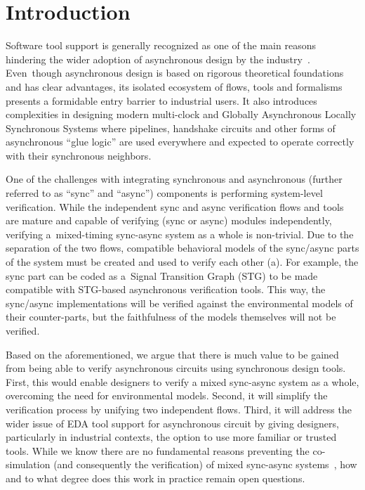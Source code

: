 \section{Introduction}
\label{sec:introduction}

Software tool support is generally recognized as one of the main reasons
hindering the wider adoption of asynchronous design by the
industry~\cite{kondratyev2002design}\cite{nowick2015asynchronous}. Even~though
asynchronous design is based on rigorous theoretical foundations and has clear
advantages, its isolated ecosystem of flows, tools and formalisms presents a
formidable entry barrier to industrial users. It also introduces complexities
in designing modern multi-clock and Globally Asynchronous Locally Synchronous
Systems where pipelines, handshake circuits and other forms of asynchronous
``glue logic'' are used everywhere and expected to operate correctly with
their synchronous neighbors.

One of the challenges with integrating synchronous and asynchronous (further
referred to as ``sync'' and ``async'') components is performing system-level
verification. While the independent sync and async verification flows and
tools are mature and capable of verifying (sync or async) modules
independently, verifying a~mixed-timing sync-async system as a whole is
non-trivial. Due to the separation of the two flows, compatible behavioral
models of the sync/async parts of the system must be created and used to
verify each other (a). For example, the sync part can be
coded as a~Signal Transition Graph (STG) to be made compatible with STG-based
asynchronous verification tools. This way, the sync/async implementations will
be verified against the environmental models of their counter-parts, but the
faithfulness of the models themselves will not be verified.

Based on the aforementioned, we argue that there is much value to be gained
from being able to verify asynchronous circuits using synchronous design
tools. First, this would enable designers to verify a mixed sync-async system
as a whole, overcoming the need for environmental models. Second, it will
simplify the verification process by unifying two independent flows. Third, it
will address the wider issue of EDA tool support for asynchronous circuit by
giving designers, particularly in industrial contexts, the option to use more
familiar or trusted tools. While we know there are no fundamental reasons
preventing the co-simulation (and consequently the verification) of mixed
sync-async systems~\cite{milner1980relating, milner1983calculi}, how and to
what degree does this work in practice remain open questions.

